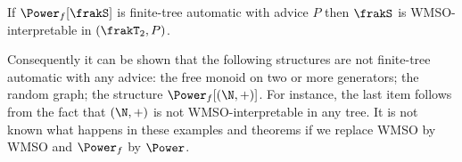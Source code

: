 \begin{theorem} \cite{CoLo07}
If $\Power_f[\frakS]$ is finite-tree automatic with advice $P$ then $\frakS$ is WMSO-interpretable in $(\frakT_2,P)$.
\end{theorem}

Consequently it can be shown that the following structures are not finite-tree automatic with any advice: the free monoid on two or more generators; the random graph; the structure $\Power_f[(\N,+)]$. For instance, the last item follows from the fact that $(\N,+)$ is not WMSO-interpretable in any tree. It is not known what happens in these examples and theorems if we replace WMSO by WMSO and $\Power_f$ by $\Power$.



%




%


